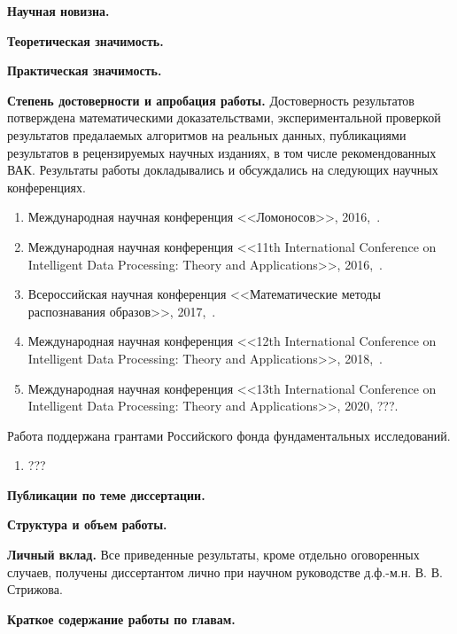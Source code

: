 \vspace{0.5cm}
\textbf{Научная новизна.}

\vspace{0.5cm}
\textbf{Теоретическая значимость.}

\vspace{0.5cm}
\textbf{Практическая значимость.}

\vspace{0.5cm}
\textbf{Степень достоверности и апробация работы.}
Достоверность результатов потверждена математическими доказательствами, экспериментальной проверкой результатов предалаемых алгоритмов на реальных данных, публикациями результатов в рецензируемых научных изданиях, в том числе рекомендованных ВАК. 
Результаты работы докладывались и обсуждались на следующих научных конференциях.
\begin{enumerate}
	\item Международная научная конференция <<Ломоносов>>, 2016,~\cite{isachenko2016lomonosov}.
	\item Международная научная конференция  <<11th International Conference on Intelligent Data Processing: Theory and Applications>>, 2016,~\cite{Neychev2016IDP}.
	\item Всероссийская научная конференция <<Математические методы распознавания образов>>, 2017,~\cite{isachenko2017localmmro}.
	\item Международная научная конференция  <<12th International Conference on Intelligent Data Processing: Theory and Applications>>, 2018,~\cite{Isachenko2018plsidp}.
	\item Международная научная конференция  <<13th International Conference on Intelligent Data Processing: Theory and Applications>>, 2020, {\color{red} ???}.
\end{enumerate} 

Работа поддержана грантами Российского фонда фундаментальных исследований.
\begin{enumerate}
	\item {\color{red} ???}
\end{enumerate}

\vspace{0.5cm}
\textbf{Публикации по теме диссертации.}

\vspace{0.5cm}
\textbf{Структура и объем работы.}

\vspace{0.5cm}
\textbf{Личный вклад.}
Все приведенные результаты, кроме отдельно оговоренных случаев, получены диссертантом лично при научном руководстве д.ф.-м.н. В. В. Стрижова.

\vspace{0.5cm}
\textbf{Краткое содержание работы по главам.}